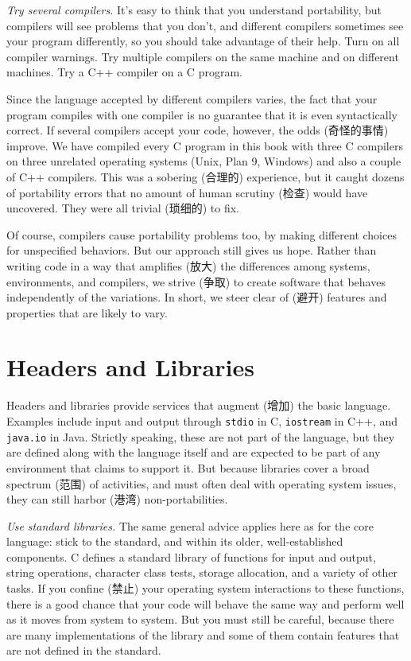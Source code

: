 \emph{Try several compilers.} It's easy to think that you understand
portability, but compilers will see problems that you don't, and different
compilers sometimes see your program differently, so you should take
advantage of their help. Turn on all compiler warnings. Try multiple
compilers on the same machine and on different machines.  Try a C++
compiler on a C program.

Since the language accepted by different compilers varies, the fact that
your program compiles with one compiler is no guarantee that it is even
syntactically correct.  If several compilers accept your code, however, the
odds (奇怪的事情) improve. We have compiled every C program in this book
with three C compilers on three unrelated operating systems (Unix, Plan 9,
Windows) and also a couple of C++ compilers. This was a sobering (合理的)
experience, but it caught dozens of portability errors that no amount of
human scrutiny (检查) would have uncovered. They were all trivial (琐细的)
to fix.

Of course, compilers cause portability problems too, by making different
choices for unspecified behaviors. But our approach still gives us hope.
Rather than writing code in a way that amplifies (放大) the differences
among systems, environments, and compilers, we strive (争取) to create
software that behaves independently of the variations. In short, we steer
clear of (避开) features and properties that are likely to vary.

\section{Headers and Libraries}
\label{sec:header_library}

Headers and libraries provide services that augment (增加) the basic
language.  Examples include input and output through \verb'stdio' in C,
\verb'iostream' in C++, and \verb'java.io' in Java.  Strictly speaking,
these are not part of the language, but they are defined along with the
language itself and are expected to be part of any environment that claims
to support it. But because libraries cover a broad spectrum (范围) of
activities, and must often deal with operating system issues, they can
still harbor (港湾) non-portabilities.

\emph{Use standard libraries.} The same general advice applies here as for
the core language: stick to the standard, and within its older,
well-established components. C defines a standard library of functions for
input and output, string operations, character class tests, storage
allocation, and a variety of other tasks. If you confine (禁止) your
operating system interactions to these functions, there is a good chance
that your code will behave the same way and perform well as it moves from
system to system. But you must still be careful, because there are many
implementations of the library and some of them contain features that are
not defined in the standard.

